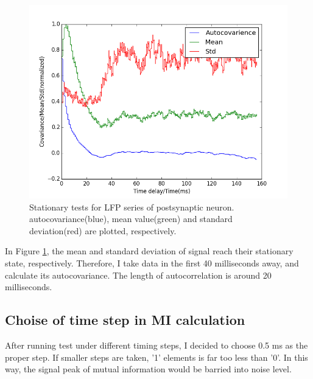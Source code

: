 \documentclass{article}
\begin{document}
			\begin{figure}[ht]
				\centering
				\includegraphics[scale = 0.5]{n2i.png}
				\caption{Stationary tests for LFP series of postsynaptic neuron. autocovariance(blue), mean value(green) and standard deviation(red) are plotted, respectively.}
				\label{fig:lfp_auto}
			\end{figure}
			In Figure \ref{fig:lfp_auto}, the mean and standard deviation of signal reach their stationary state, respectively. Therefore, I take data in the first 40 milliseconds away, and calculate its autocovariance. The length of autocorrelation is around 20 milliseconds.

		\subsection{Choise of time step in MI calculation}
			After running test under different timing steps, I decided to choose 0.5 ms as the proper step. If smaller steps are taken, '1' elements is far too less than '0'. In this way, the signal peak of mutual information would be barried into noise level.
\end{document}
